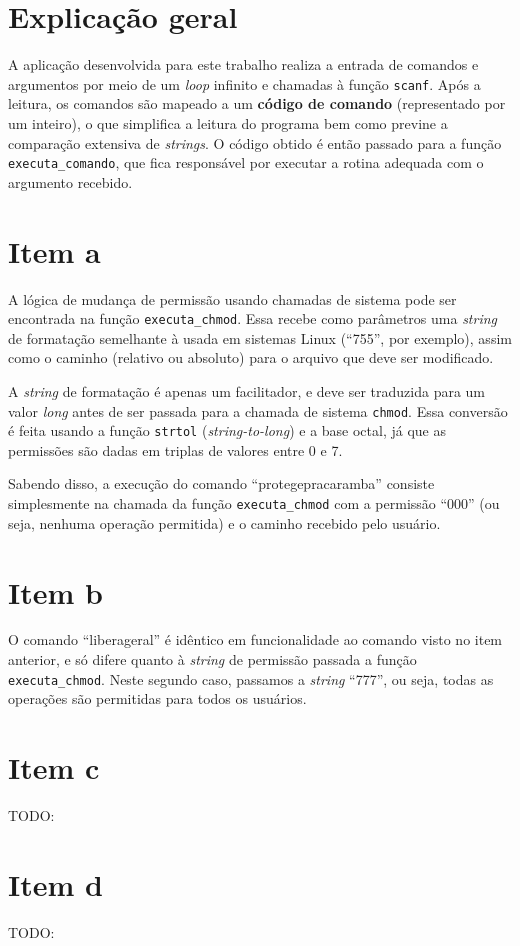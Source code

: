 \documentclass[12pt, twoside, a4paper]{article}
\newcommand{\todo}[1]{{\color{red} TODO: #1}}
\begin{document}
\section{Explicação geral}%

A aplicação desenvolvida para este trabalho realiza a entrada de comandos e argumentos por meio de um \textit{loop} infinito e chamadas à função \verb|scanf|. Após a leitura, os comandos são mapeado a um \textbf{código de comando} (representado por um inteiro), o que simplifica a leitura do programa bem como previne a comparação extensiva de \emph{strings}. O código obtido é então passado para a função \verb|executa_comando|, que fica responsável por executar a rotina adequada com o argumento recebido.

\section{Item a}%

A lógica de mudança de permissão usando chamadas de sistema pode ser encontrada na função \verb|executa_chmod|. Essa recebe como parâmetros uma \emph{string} de formatação semelhante à usada em sistemas Linux (``755'', por exemplo), assim como o caminho (relativo ou absoluto) para o arquivo que deve ser modificado.

A \emph{string} de formatação é apenas um facilitador, e deve ser traduzida para um valor \textit{long} antes de ser passada para a chamada de sistema \verb|chmod|. Essa conversão é feita usando a função \verb|strtol| (\textit{string-to-long}) e a base octal, já que as permissões são dadas em triplas de valores entre 0 e 7.

Sabendo disso, a execução do comando ``protegepracaramba'' consiste simplesmente na chamada da função \verb|executa_chmod| com a permissão ``000'' (ou seja, nenhuma operação permitida) e o caminho recebido pelo usuário.

\section{Item b}%

O comando ``liberageral'' é idêntico em funcionalidade ao comando visto no item anterior, e só difere quanto à \textit{string} de permissão passada a função \verb|executa_chmod|. Neste segundo caso, passamos a \emph{string} ``777'', ou seja, todas as operações são permitidas para todos os usuários.

\section{Item c}%
\todo{}

\section{Item d}%
\todo{}
\end{document}
